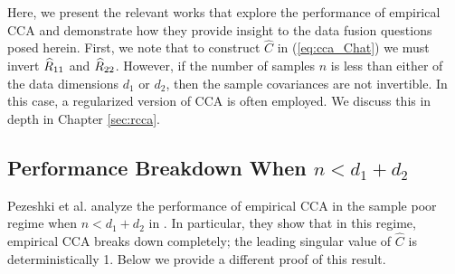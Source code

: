Here, we present the relevant works that explore the performance of empirical CCA and
demonstrate how they provide insight to the data fusion questions posed herein. First, we
note that to construct $\widehat{C}$ in (\ref{eq:cca_Chat}) we must invert $\widehat{R}_{11}$ and
$\widehat{R}_{22}$. However, if the number of samples $n$ is less than either of the data
dimensions $d_1$ or $d_2$, then the sample covariances are not invertible. In this case, a
regularized version of CCA is often employed. We discuss this in depth in Chapter
\ref{sec:rcca}.

\subsection{Performance Breakdown When $n<d_1+d_2$}
Pezeshki et al. analyze the performance of empirical CCA in the sample poor regime when
$n<d_1+d_2$ in \cite{pezeshki2004empirical}. In particular, they show that in this regime,
empirical CCA breaks down completely; the leading singular value of $\widehat{C}$ is 
deterministically 1. Below we provide a different proof of this result.


